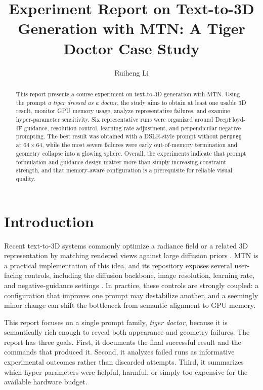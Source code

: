 \documentclass[sigconf,nonacm]{acmart}
\title[Experiment Report on Text-to-3D Generation with MTN]{Experiment Report on Text-to-3D Generation with MTN: A Tiger Doctor Case Study}
\author{Ruiheng Li}
\affiliation{%
  \institution{University of Macau}
  \city{Macau}
  \country{China}
}
\begin{document}
\begin{abstract}
This report presents a course experiment on text-to-3D generation with MTN. Using the prompt \textit{a tiger dressed as a doctor}, the study aims to obtain at least one usable 3D result, monitor GPU memory usage, analyze representative failures, and examine hyper-parameter sensitivity. Six representative runs were organized around DeepFloyd-IF guidance, resolution control, learning-rate adjustment, and perpendicular negative prompting. The best result was obtained with a DSLR-style prompt without \texttt{perpneg} at $64\times 64$, while the most severe failures were early out-of-memory termination and geometry collapse into a glowing sphere. Overall, the experiments indicate that prompt formulation and guidance design matter more than simply increasing constraint strength, and that memory-aware configuration is a prerequisite for reliable visual quality.
\end{abstract}

\maketitle

\section{Introduction}
Recent text-to-3D systems commonly optimize a radiance field or a related 3D representation by matching rendered views against large diffusion priors \cite{poole2022dreamfusion, yi2026progressive}. MTN is a practical implementation of this idea, and its repository exposes several user-facing controls, including the diffusion backbone, image resolution, learning rate, and negative-guidance settings \cite{texaser-mtn-repo}. In practice, these controls are strongly coupled: a configuration that improves one prompt may destabilize another, and a seemingly minor change can shift the bottleneck from semantic alignment to GPU memory.

This report focuses on a single prompt family, \textit{tiger doctor}, because it is semantically rich enough to reveal both appearance and geometry failures. The report has three goals. First, it documents the final successful result and the commands that produced it. Second, it analyzes failed runs as informative experimental outcomes rather than discarded attempts. Third, it summarizes which hyper-parameters were helpful, harmful, or simply too expensive for the available hardware budget.
\end{document}
